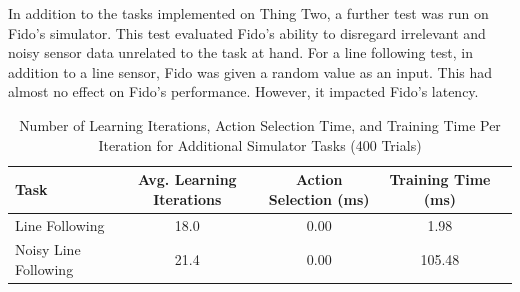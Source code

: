 \documentclass[letterpaper,11pt]{article}
\begin{document}
	In addition to the tasks implemented on Thing Two, a further test was run on Fido's simulator.  This test evaluated Fido's ability to disregard irrelevant and noisy sensor data  unrelated to the task at hand.   For a line following test, in addition to a line sensor, Fido was given a random value as an input. This had almost no effect on Fido's performance. However, it impacted Fido's latency.

	\begin{table}[ht]
		\centering
		\begin{tabular}{@{}lcccc@{}}
			\toprule
			Task        & Avg. Learning Iterations & Action Selection (ms) & Training Time (ms) \\ \midrule
			Line Following       & 18.0                                    & 0.00               & 1.98               \\
			Noisy Line Following       & 21.4                                   & 0.00               & 105.48               \\
		\end{tabular}
		\caption{Number of Learning Iterations, Action Selection Time, and Training Time Per Iteration for Additional Simulator Tasks (400 Trials)}
		\label{tab:data2}
	\end{table}
\end{document}
